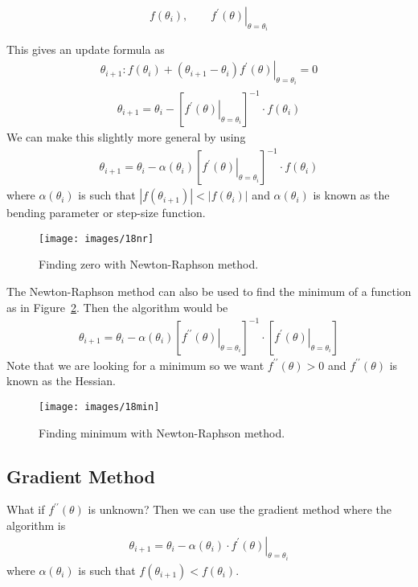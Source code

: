 \begin{equation*}
f(\theta_i), \qquad \left.f^\prime(\theta)\right|_{\theta=\theta_i}
\end{equation*}

This gives an update formula as
\begin{align*}
\theta_{i+1}: f(\theta_i) + (\theta_{i+1}-\theta_i)\left.f^\prime(\theta)\right|_{\theta=\theta_i} = 0
\end{align*}
\begin{align*}
\boxed{\theta_{i+1} = \theta_i - {\left[\left.f^\prime(\theta)\right|_{\theta=\theta_i}\right]}^{-1}\cdot f(\theta_i)}
\end{align*}
We can make this slightly more general by using
\begin{align*}
\boxed{\theta_{i+1} = \theta_i - \alpha(\theta_i){\left[\left.f^\prime(\theta)\right|_{\theta=\theta_i}\right]}^{-1}\cdot f(\theta_i)}
\end{align*}
where $\alpha(\theta_i)$ is such that $|f(\theta_{i+1})|<|f(\theta_i)|$ and $\alpha(\theta_i)$ is known as the bending parameter or step-size function.

\begin{figure}[ht!]
\centering
\texttt{[image: images/18nr]}
\caption{Finding zero with Newton-Raphson method.}%
\label{fig:18nr}
\end{figure}

The Newton-Raphson method can also be used to find the minimum of a function as in Figure~\ref{fig:18min}.
Then the algorithm would be
\begin{align*}
\boxed{\theta_{i+1} = \theta_i - \alpha(\theta_i){\left[\left.f^{\prime\prime}(\theta)\right|_{\theta=\theta_i}\right]}^{-1}\cdot\left[\left.f^\prime(\theta)\right|_{\theta=\theta_i}\right]}
\end{align*}
Note that we are looking for a minimum so we want $f^{\prime\prime}(\theta)>0$ and $f^{\prime\prime}(\theta)$ is known as the Hessian.

\begin{figure}[ht!]
\centering
\texttt{[image: images/18min]}
\caption{Finding minimum with Newton-Raphson method.}%
\label{fig:18min}
\end{figure}

\subsection{Gradient Method}
What if $f^{\prime\prime}(\theta)$ is unknown? Then we can use the gradient method where the algorithm is
\begin{align*}
\boxed{\theta_{i+1} = \theta_i - \alpha(\theta_i)\cdot \left.f^\prime(\theta)\right|_{\theta=\theta_i}}
\end{align*}
where $\alpha(\theta_i)$ is such that $f(\theta_{i+1})<f(\theta_i)$.

